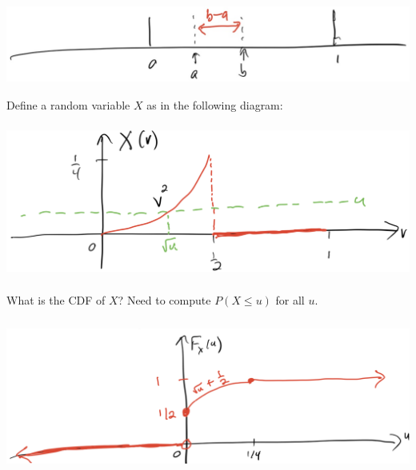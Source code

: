 \documentclass[10pt]{article}
\begin{document}
\begin{flushleft}
\begin{itemize}
        \begin{center}
            \includegraphics[width=6in, height=1in]{Week_4.2}
        \end{center}

        Define a random variable $X$ as in the following diagram:

        \begin{center}
            \includegraphics[width=6in, height=2in]{Week_4.3}
        \end{center}

        What is the CDF of $X$? Need to compute $P(X \leq u)$ for all $u$.

        \begin{center}
            \includegraphics[width=6in, height=2in]{Week_4.4}
        \end{center}


\end{itemize}
\end{flushleft}
\end{document}
